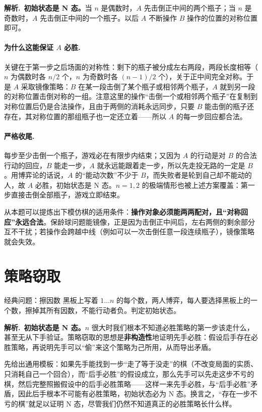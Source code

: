 \documentclass[UTF8,a4paper,11pt,oneside,openany,fontset=fandol]{ctexbook}
\theoremstyle{definition}
\newcommand{\sol}{\par\noindent\textbf{解析.}\ }
\begin{document}
\sol \textbf{初始状态是 N 态。}当 $n$ 是偶数时，$A$ 先击倒正中间的两个瓶子；当 $n$ 是奇数时，$A$ 先击倒正中间的一个瓶子。以后 $A$ 不断操作 $B$ 操作的位置的对称位置即可。

\paragraph{为什么这能保证 $A$ 必胜.} 关键在于第一步之后场面的对称性：剩下的瓶子被分成左右两段，两段长度相等（$n$ 为偶数时各 $n/2$ 个，$n$ 为奇数时各 $(n-1)/2$ 个），关于正中间完全对称。于是 $A$ 采取镜像策略：$B$ 在某一段击倒了某个瓶子或相邻两个瓶子，$A$ 就到另一段的对称位置击倒对称的一组。注意这里的操作“击倒一个或相邻两个瓶子”在复制到对称位置后仍是合法操作，且由于两侧的消耗永远同步，只要 $B$ 能击倒的瓶子还存在，其对称位置的那组瓶子也一定还立着——所以 $A$ 的每一步回应都合法。

\paragraph{严格收尾.} 每步至少击倒一个瓶子，游戏必在有限步内结束；又因为 $A$ 的行动是对 $B$ 的合法行动的回应，$B$ 能走一步，$A$ 就永远能跟着走一步，所以先走投无路的一定是 $B$。用博弈论的话说，$A$ 的“能动次数”不少于 $B$，而失败者是轮到自己却不能动的人，故 $A$ 必胜，初始状态是 N 态。$n=1,2$ 的极端情形也被上述方案覆盖：第一步直接击倒全部瓶子，游戏立即结束。

从本题可以提炼出下模仿棋的适用条件：\textbf{操作对象必须能两两配对，且“对称回应”永远合法}。保龄球问题能镜像，正是因为击倒正中间后，左右两侧的剩余部分互不干扰；若操作会跨越中线（例如可以一次击倒任意一段连续瓶子），镜像策略就会失效。

\section{策略窃取}
\begin{problem}{经典问题：擦因数}
黑板上写着 $1\ldots n$ 的每个数，两人博弈，每人要选择黑板上的一个数，擦掉其所有因数，不能行动者负。判定初始状态。
\end{problem}

\sol \textbf{初始状态是 N 态。}$n$ 很大时我们根本不知道必胜策略的第一步该走什么，甚至无从下手验证。策略窃取的思想是\textbf{非构造性}地证明先手必胜：假设后手存在必胜策略，再说明先手可以“偷”来这个策略为己所用，从而导出矛盾。

先给出通用模板：如果先手能找到一步“走了等于没走”的棋（不改变局面的实质、只消耗自己一个回合），而“后手必胜”的假设成立，那么先手可以先走这步不亏的棋，然后完整照搬假设中的后手必胜策略——这样一来先手必胜，与“后手必胜”矛盾，因此后手根本不可能有必胜策略，初始状态必为 N 态。换言之，“存在一步不亏的棋”就足以证明 N 态，尽管我们仍然不知道真正的必胜策略长什么样。
\end{document}
